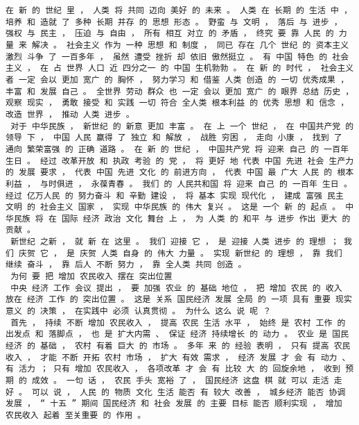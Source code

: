 \documentclass{article}
\begin{document}
\begin{Verbatim}[commandchars=\\\{\}]
 在 新 的 世纪 里 ， 人类 将 共同 迈向 美好 的 未来 。 人类 在 长期 的 生活 中 ， 培养 和 造就 了 多种 长期 并存 的 思想 形态 。 野蛮 与 文明 ， 落后 与 进步 ， 强权 与 民主 ， 压迫 与 自由 ， 所有 相互 对立 的 矛盾 ， 终究 要 靠 人民 的 力量 来 解决 。 社会主义 作为 一种 思想 和 制度 ， 同已 存在 几个 世纪 的 资本主义 激烈 斗争 了 一百多年 ， 虽然 遭受 挫折 却 依旧 傲然挺立 。 有 中国 特色 的 社会主义 ， 在 占 世界 人口 近 四分之一 的 中国 生机勃勃 。 在 新 的 时代 ， 社会主义者 一定 会以 更加 宽广 的 胸怀 ， 努力学习 和 借鉴 人类 创造 的 一切 优秀成果 ， 丰富 和 发展 自己 。 全世界 劳动 群众 也 一定 会以 更加 宽广 的 眼界 总结 历史 ， 观察 现实 ， 勇敢 接受 和 实践 一切 符合 全人类 根本利益 的 优秀 思想 和 信念 ， 改造 世界 ， 推动 人类 进步 。 
 对于 中华民族 ， 新世纪 的 新意 更加 丰富 。 在 上 一个 世纪 ， 在 中国共产党 的 领导 下 ， 中国 人民 赢得 了 独立 和 解放 ， 战胜 穷困 ， 走向 小康 ， 找到 了 通向 繁荣富强 的 正确 道路 。 在 新 的 世纪 ， 中国共产党 将 迎来 自己 的 一百年 生日 。 经过 改革开放 和 执政 考验 的 党 ， 将 更好 地 代表 中国 先进 社会 生产力 的 发展 要求 ， 代表 中国 先进 文化 的 前进方向 ， 代表 中国 最 广大 人民 的 根本利益 ， 与时俱进 ， 永葆青春 。 我们 的 人民共和国 将 迎来 自己 的 一百年 生日 。 经过 亿万人民 的 努力奋斗 和 辛勤 建设 ， 将 基本 实现 现代化 ， 建成 富强 民主 文明 的 社会主义 国家 ， 实现 中华民族 的 伟大 复兴 。 这是 一个 新 的 起点 。 中华民族 将 在 国际 经济 政治 文化 舞台 上 ， 为 人类 的 和平 与 进步 作出 更大 的 贡献 。 
 新世纪 之新 ， 就 新 在 这里 。 我们 迎接 它 ， 是 迎接 人类 进步 的 理想 ； 我们 庆贺 它 ， 是 庆贺 人类 自身 的 伟大 力量 。 实现 新世纪 的 理想 ， 靠 我们 继续 奋斗 ， 靠 后人 不断 努力 ， 靠 全人类 共同 创造 。 
 为何 要 把 增加 农民收入 摆在 突出位置 
 中央 经济 工作 会议 提出 ， 要 加强 农业 的 基础 地位 ， 把 增加 农民 的 收入 放在 经济 工作 的 突出位置 。 这是 关系 国民经济 发展 全局 的 一项 具有 重要 现实意义 的 决策 ， 在实践中 必须 认真贯彻 。 为什么 这么 说 呢 ？ 
 首先 ， 持续 不断 增加 农民收入 ， 提高 农民 生活 水平 ， 始终 是 农村 工作 的 出发点 和 落脚点 ， 也 是 扩大内需 、 保证 经济 持续增长 的 动力 。 农业 是 国民经济 的 基础 ， 农村 有着 巨大 的 市场 。 多年 来 的 经验 表明 ， 只有 提高 农民收入 ， 才能 不断 开拓 农村 市场 ， 扩大 有效 需求 ， 经济 发展 才 会 有 动力 、 有 活力 ； 只有 增加 农民收入 ， 各项改革 才 会 有 比较 大 的 回旋余地 ， 收到 预期 的 成效 。 一句 话 ， 农民 手头 宽裕 了 ， 国民经济 这盘 棋 就 可以 走活 走 好 。 可以 说 ， 人民 的 物质 文化 生活 能否 有 较大 改善 ， 城乡经济 能否 协调 发展 ， “ 十五 ” 期间 国民经济 和 社会 发展 的 主要 目标 能否 顺利实现 ， 增加 农民收入 起着 至关重要 的 作用 。 

\end{Verbatim}
\end{document}
